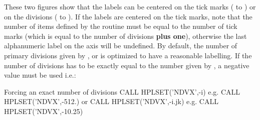 \begin{UL}
      These two figures show that the labels can be centered on the tick marks
      ( to ) or on the divisions ( to ). If the 
      labels are centered on the tick marks, note that the number of items 
      defined by the routine  must be equal to the number of tick
      marks (which is equal to the number of divisions {\bf plus one}),
      otherwise the last alphanumeric label on the axis will be undefined.
       By default, the number of primary divisions given by 
      ,  or 
       is optimized to have a reasonable labelling.
      If the number of divisions has to be exactly equal to the number given by
      , a negative value must be used i.e.:
 
      \begin{XMPt}{Forcing an exact number of divisions}
          CALL HPLSET('NDVX',-i)      e.g.   CALL HPLSET('NDVX',-512.)
       {\rm or}
          CALL HPLSET('NDVX',-i.jk)   e.g.   CALL HPLSET('NDVX',-10.25)
      \end{XMPt}
 
      \newpage
      \begin{Fighere}
      \begin{center}\mbox{}\end{center}
      \caption{Example of labelling for horizontal axes}
      \label{fig:LABNDVX}
      \end{Fighere}
 
      \begin{Fighere}
      \begin{center}\mbox{}\end{center}
      \caption{Example of labelling for vertical axes}
      \label{fig:LABNDVY}
      \end{Fighere}
\end{UL}

\newpage

